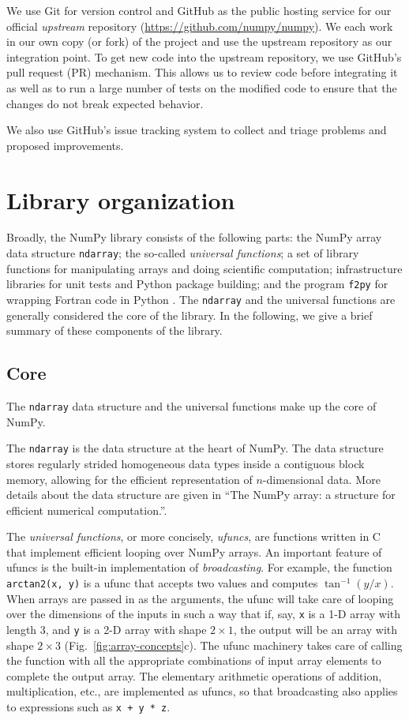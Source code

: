 We use Git for version control and GitHub as the public hosting service for our
official \emph{upstream} repository (\url{https://github.com/numpy/numpy}).
We each work in our own copy (or fork) of the project and use the
upstream repository as our integration point.
To get new code into the upstream repository, we use GitHub's
pull request (PR) mechanism.
This allows us to review code before integrating it as well as to run a
large number of tests on the modified code to ensure that the changes
do not break expected behavior.

We also use GitHub's issue tracking system to collect and triage problems and
proposed improvements.


\section*{Library organization}

Broadly, the NumPy library consists of the following parts:
the NumPy array data structure \texttt{ndarray}; the so-called \emph{universal functions};
a set of library functions for manipulating arrays and doing scientific
computation; infrastructure libraries for unit tests and Python package
building; and the program \texttt{f2py} for wrapping Fortran code in Python \cite{peterson2009f2py}.
The \texttt{ndarray} and the universal functions are generally considered
the core of the library.
In the following, we give a brief summary of these components of the
library.

\subsection*{Core}

The \texttt{ndarray} data structure and the
universal functions make up the core of NumPy.

The \texttt{ndarray} is the data structure at the heart of NumPy.
The data structure stores regularly strided homogeneous data types
inside a contiguous block memory, allowing for the efficient representation
of $n$-dimensional data.
More details about the data structure are given in ``The NumPy array:
a structure for efficient numerical computation.''\cite{vanderwalt2011numpy}.

The \emph{universal functions}, or more concisely, \emph{ufuncs},
are functions written in C that implement efficient looping over
NumPy arrays. An important feature of ufuncs is the built-in
implementation of \emph{broadcasting}.  For example, the function
\texttt{arctan2(x, y)} is a ufunc that accepts two values and computes
$\tan^{-1}(y/x)$.  When arrays are passed in as the arguments,
the ufunc will take care of looping over the dimensions of the inputs
in such a way that if, say, \texttt{x} is a 1-D array with length 3, and
\texttt{y} is a 2-D array with shape $2 \times 1$, the output will be
an array with shape $2 \times 3$ (Fig.~\ref{fig:array-concepts}c).
The ufunc machinery takes care
of calling the function with all the appropriate combinations of
input array elements to complete the output array.
The elementary arithmetic operations of addition, multiplication, etc.,
are implemented as ufuncs, so that broadcasting also applies to expressions
such as \texttt{x + y * z}.

